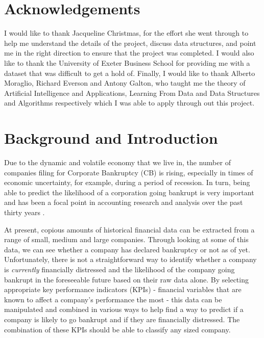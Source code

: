 \documentclass[11pt]{article}
\begin{document}
\section*{\center Acknowledgements}
\begin{center}


I would like to thank Jacqueline Christmas, for the effort she went through to help me understand the details of the project, discuss data structures, and point me in the right direction to ensure that the project was completed. I would also like to thank the University of Exeter Business School for providing me with a dataset that was difficult to get a hold of. Finally, I would like to thank Alberto Moraglio, Richard Everson and Antony Galton, who taught me the theory of Artificial Intelligence and Applications, Learning From Data and Data Structures and Algorithms respectively which I was able to apply through out this project. 
\end{center}
\cleardoublepage
\tableofcontents
\cleardoublepage
{}
\setcounter{page}{1}
\section{Background and Introduction }\label{sec:intro}
Due to the dynamic and volatile economy that we live in, the number of companies filing for Corporate Bankruptcy (CB) is rising, especially in times of economic uncertainty, for example, during a period of recession. In turn, being able to predict the likelihood of a corporation going bankrupt is very important and has been a focal point in accounting research and analysis over the past thirty years \citep{ref-two,ref-one}.

At present, copious amounts of historical financial data can be extracted from a range of small, medium and large companies. Through looking at some of this data, we can see whether a company has declared bankruptcy or not as of yet. Unfortunately, there is not a straightforward way to identify whether a company is \textit{currently} financially distressed and the likelihood of the company going bankrupt in the foreseeable future based on their raw data alone. By selecting appropriate key performance indicators (KPIs) - financial variables that are known to affect a company's performance the most - this data can be manipulated and combined in various ways to help find a way to predict if a company is likely to go bankrupt and if they are financially distressed. The combination of these KPIs should be able to classify any sized company. 
\end{document}
